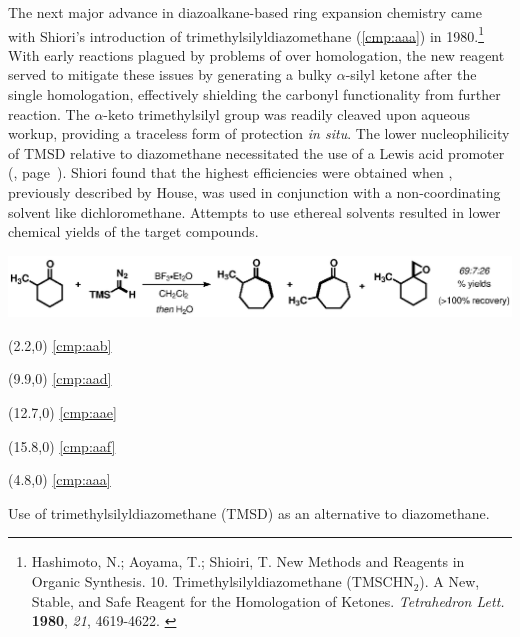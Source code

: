 The next major advance in diazoalkane-based ring expansion chemistry came with Shiori's introduction
of trimethylsilyldiazomethane (\ref{cmp:aaa}) in 1980.\footnote{{\frenchspacing Hashimoto, N.;
Aoyama, T.; Shioiri, T. New Methods and Reagents in Organic Synthesis. 10.
Trimethylsilyldiazomethane (TMSCHN$_2$). A New, Stable, and Safe Reagent for the Homologation of
Ketones. \textit{Tetrahedron Lett.} \textbf{1980}, \textit{21}, 4619-4622.} \label{ref:shioiri}}
With early reactions plagued by problems of over homologation, the new reagent served to mitigate these issues by
generating a bulky $\alpha$-silyl ketone after the single homologation, effectively
shielding the carbonyl functionality from further reaction. The $\alpha$-keto trimethylsilyl group was readily cleaved upon aqueous
workup, providing a traceless form of protection \textit{in situ}. The lower nucleophilicity of TMSD
relative to diazomethane necessitated the use of a Lewis acid promoter
(, page~\pageref{fig:nucleophilicity}). Shiori found that the highest
efficiencies were obtained when , previously described by House,
was used in conjunction with a non-coordinating solvent like dichloromethane. Attempts to use
ethereal solvents resulted in lower chemical yields of the target compounds. 
\begin{Scheme}[h]
  \centering
  \includegraphics[scale=0.8]{chp_diazobkg/images/shioirione}
   \begin{textblock}{1}(2.2,0) \textsf{\scriptsize{\ref{cmp:aab}}}
 \end{textblock}
 \begin{textblock}{1}(9.9,0) \textsf{\scriptsize{\ref{cmp:aad}}}
 \end{textblock}
 \begin{textblock}{1}(12.7,0) \textsf{\scriptsize{\ref{cmp:aae}}}
 \end{textblock}
  \begin{textblock}{1}(15.8,0) \textsf{\scriptsize{\ref{cmp:aaf}}}
 \end{textblock}
   \begin{textblock}{1}(4.8,0) \textsf{\scriptsize{\ref{cmp:aaa}}}
 \end{textblock}
 \vspace{5pt}
  \caption{Use of trimethylsilyldiazomethane (TMSD) as an alternative to
  diazomethane.}
  \label{sch:shioiri}
\end{Scheme}

